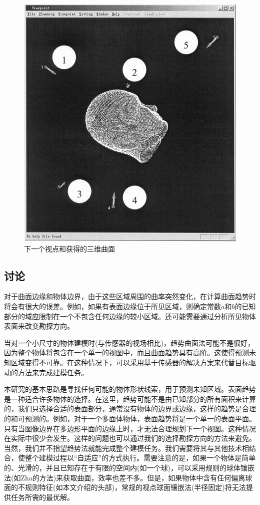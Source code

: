 \documentclass[AutoFakeBold,zihao=-4]{ctexart}
\begin{document}
	\begin{figure}[H]
		\centering
		\includegraphics[scale=0.4]{PIC19}
		\caption{下一个视点和获得的三维曲面}
		\label{fig-19}
	\end{figure}

	\subsection{讨论}
	对于曲面边缘和物体边界，由于这些区域周围的曲率突然变化，在计算曲面趋势时将会有很大的误差。例如，如果有表面边缘位于所见区域，则确定常数$ a $和$ b $的已知部分的域应限制在一个不包含任何边缘的较小区域。还可能需要通过分析所见物体表面来改变勘探方向。
	
	当对一个小尺寸的物体建模时(与传感器的视场相比)，趋势曲面法可能不是很好，因为整个物体将包含在一个单一的视图中，而且曲面趋势具有高阶。这使得预测未知区域变得不可靠。在这种情况下，可以采用基于传感器的解决方案\cite{pito1999solution}来代替目标驱动的方法来完成建模任务。
	
	本研究的基本思路是寻找任何可能的物体形状线索，用于预测未知区域。表面趋势是一种适合许多物体的选择。在这里，趋势可能不是由已知部分的所有面积来计算的，我们只选择合适的表面部分，通常没有物体的边界或边缘，这样的趋势是合理的和可预测的。例如，对于一个多面体物体，表面趋势将是一个单一的表面平面。只有当图像边界在多边形平面的边缘上时，才无法合理规划下一个视图。这种情况在实际中很少会发生。这样的问题也可以通过我们的选择勘探方向的方法来避免。当然，我们并不指望趋势法就能完成整个建模任务。我们需要将其与其他技术相结合，使整个建模过程以“自适应”的方式执行。需要注意的是，如果一个物体是简单的、光滑的，并且已知存在于有限的空间内(如一个球)，可以采用规则的球体镶嵌法(如Zha\cite{zha1997active}的方法)来获取曲面，效率也差不多。但是，如果物体中含有任何偏离球面的不规则特征(如本文介绍的头部)，常规的视点球面镶嵌法(半径固定)将无法提供任务所需的最优解。
	
\end{document}
